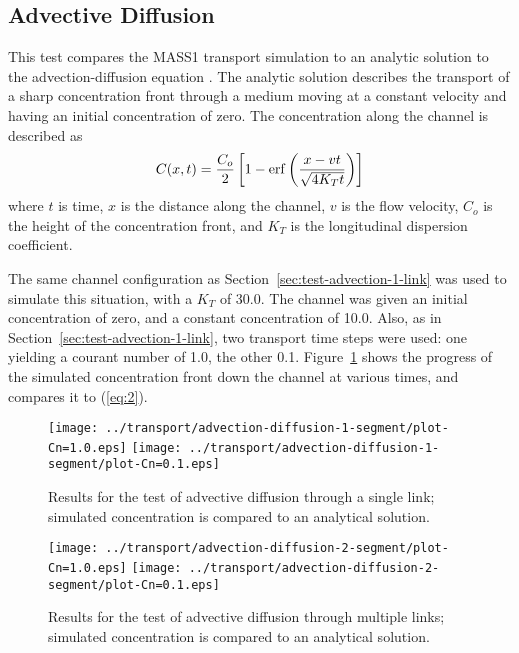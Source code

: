 \documentclass[12pt,dvips,letterpaper]{article}
\begin{document}
\subsection{Advective Diffusion}
\label{sec:test-advection-diffusion-1-link}

This test compares the MASS1 transport simulation to an analytic
solution to the advection-diffusion equation \citep[][\S~2.4]{Fis79}.
The analytic solution describes the transport of a sharp concentration
front through a medium moving at a constant velocity and having an
initial concentration of zero.  The concentration along the channel is
described as
\begin{equation}
  \label{eq:2}
  C(x,t) = { { C_{o} } \over 2 } \left[ { 1 - \mathrm{erf} \left( { { x - vt } 
          \over { \sqrt{4 K_{T} t} } } \right) } \right]
\end{equation}
where $t$ is time, $x$ is the distance along the channel, $v$ is the
flow velocity, $C_{o}$ is the height of the concentration front, and
$K_{T}$ is the longitudinal dispersion coefficient.  

The same channel configuration as
Section~\ref{sec:test-advection-1-link} was used to simulate this
situation, with a $K_{T}$ of 30.0.  The channel was given an initial
concentration of zero, and a constant concentration of 10.0. Also, as
in Section~\ref{sec:test-advection-1-link}, two transport time steps
were used: one yielding a courant number of 1.0, the other 0.1.
Figure~\ref{fig:test-advection-diffusion-1-results} shows the progress
of the simulated concentration front down the channel at various
times, and compares it to (\ref{eq:2}).


\begin{figure}[htbp]
  \begin{center}
    \texttt{[image: ../transport/advection-diffusion-1-segment/plot-Cn=1.0.eps]}
    \texttt{[image: ../transport/advection-diffusion-1-segment/plot-Cn=0.1.eps]}
    \caption{Results for the test of advective diffusion through a single link;
      simulated concentration is compared to an analytical solution.}
    \label{fig:test-advection-diffusion-1-results}
  \end{center}
\end{figure}


\begin{figure}[htbp]
  \begin{center}
    \texttt{[image: ../transport/advection-diffusion-2-segment/plot-Cn=1.0.eps]}
    \texttt{[image: ../transport/advection-diffusion-2-segment/plot-Cn=0.1.eps]}
    \caption{Results for the test of advective diffusion through multiple links;
      simulated concentration is compared to an analytical solution.}
    \label{fig:test-advection-diffusion-2-results}
  \end{center}
\end{figure}
\end{document}
